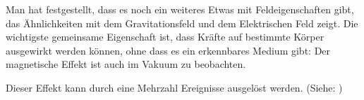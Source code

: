 Man hat festgestellt, dass es noch ein weiteres Etwas mit Feldeigenschaften gibt, das Ähnlichkeiten mit dem Gravitationsfeld und dem Elektrischen Feld zeigt. Die wichtigste gemeinsame Eigenschaft ist, dass Kräfte auf bestimmte Körper ausgewirkt werden können, ohne dass es ein erkennbares Medium gibt: Der magnetische Effekt ist auch im Vakuum zu beobachten. 

Dieser Effekt kann durch eine Mehrzahl Ereignisse ausgelöst werden. (Siehe: )




